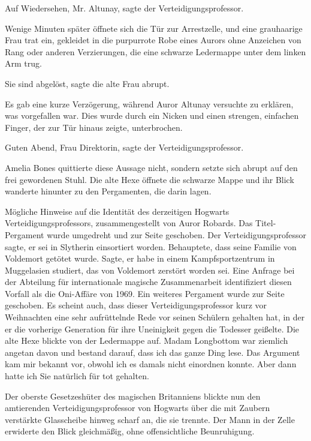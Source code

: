 \glqq{}Auf Wiedersehen, Mr. Altunay\grqq{}, sagte der Verteidigungsprofessor.

Wenige Minuten später öffnete sich die Tür zur Arrestzelle, und eine grauhaarige
Frau trat ein, gekleidet in die purpurrote Robe eines Aurors ohne Anzeichen von
Rang oder anderen Verzierungen, die eine schwarze Ledermappe unter dem linken
Arm trug.

\glqq{}Sie sind abgelöst\grqq{}, sagte die alte Frau abrupt.

Es gab eine kurze Verzögerung, während Auror Altunay versuchte zu erklären, was
vorgefallen war. Dies wurde durch ein Nicken und einen strengen, einfachen
Finger, der zur Tür hinaus zeigte, unterbrochen.

\glqq{}Guten Abend, Frau Direktorin\grqq{}, sagte der Verteidigungsprofessor.

Amelia Bones quittierte diese Aussage nicht, sondern setzte sich abrupt auf den
frei gewordenen Stuhl. Die alte Hexe öffnete die schwarze Mappe und ihr Blick
wanderte hinunter zu den Pergamenten, die darin lagen.

\glqq{}Mögliche Hinweise auf die Identität des derzeitigen Hogwarts
Verteidigungsprofessors, zusammengestellt von Auror Robards.\grqq{} Das
Titel-Pergament wurde umgedreht und zur Seite geschoben. \glqq{}Der
Verteidigungsprofessor sagte, er sei in Slytherin einsortiert worden.
Behauptete, dass seine Familie von Voldemort getötet wurde. Sagte, er habe in
einem Kampfsportzentrum in Muggelasien studiert, das von Voldemort zerstört
worden sei. Eine Anfrage bei der Abteilung für internationale magische
Zusammenarbeit identifiziert diesen Vorfall als die Oni-Affäre von 1969.\grqq{}
Ein weiteres Pergament wurde zur Seite geschoben. \glqq{}Es scheint auch, dass
dieser Verteidigungsprofessor kurz vor Weihnachten eine sehr aufrüttelnde Rede
vor seinen Schülern gehalten hat, in der er die vorherige Generation für ihre
Uneinigkeit gegen die Todesser geißelte.\grqq{} Die alte Hexe blickte von der
Ledermappe auf. \glqq{}Madam Longbottom war ziemlich angetan davon und bestand
darauf, dass ich das ganze Ding lese. Das Argument kam mir bekannt vor, obwohl
ich es damals nicht einordnen konnte. Aber dann hatte ich Sie natürlich für tot
gehalten.\grqq{}

Der oberste Gesetzeshüter des magischen Britanniens blickte nun den amtierenden
Verteidigungsprofessor von Hogwarts über die mit Zaubern verstärkte Glasscheibe
hinweg scharf an, die sie trennte. Der Mann in der Zelle erwiderte den Blick
gleichmäßig, ohne offensichtliche Beunruhigung.

